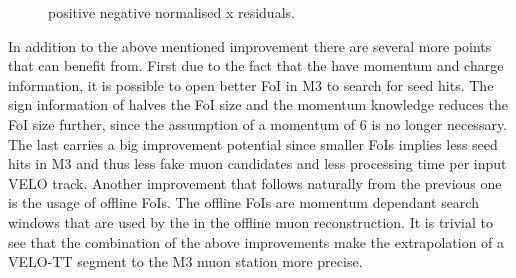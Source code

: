 \begin{figure}[h]
  \centering
  \begin{subfigure}{0.5\textwidth}
    \scalebox{.6}{}
    \caption{}
    \label{mvTTm_pos_neg_x_norm}
  \end{subfigure}%
  \hfill%
  \begin{subfigure}{0.5\textwidth}
    \scalebox{.6}{}
    \caption{}
    \label{mvm_pos_neg_x_norm}
  \end{subfigure}
  \caption{positive negative normalised x residuals. }
 \label{mvm_pos_neg_x_norm_comp}
\end{figure}



In addition to the above mentioned improvement there are several more points that \mvm can benefit from.
First due to the fact that the \veloTTCand have momentum and charge information, it is possible to open better
FoI in M3 to search for seed hits. The sign information of \veloTTCand halves the FoI size
and the momentum knowledge reduces the FoI size further, since the assumption of a momentum of 6 \mev
is no longer necessary. The last carries a big improvement potential
since smaller FoIs implies less seed hits in M3 and thus less fake muon candidates and less processing time per input VELO track.
Another improvement that follows naturally from the previous one is the usage of offline FoIs.
The offline FoIs are momentum dependant search windows that are used
by the \muonID in the offline muon reconstruction. It is trivial to see that the combination of the above improvements
make the extrapolation of a VELO-TT segment to the M3 muon station more precise.


